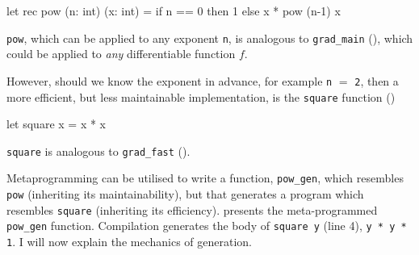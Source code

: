 \begin{code}
\begin{ocamllst}
let rec pow (n: int) (x: int) = 
  if n == 0 then 1 
  else x * pow (n-1) x
\end{ocamllst}
\label{listing:ocaml-pow-maintainable}
\end{code}

\texttt{pow}, which can be applied to any exponent \texttt{n}, is analogous to \texttt{grad_main} (), which could be applied to \textit{any} differentiable function $f$. 

However, should we know the exponent in advance, for example \texttt{n} $ =$ \texttt{2}, then a more efficient, but less maintainable implementation, is the \texttt{square} function () 

\begin{code}
\begin{ocamllst}
let square x = x * x
\end{ocamllst}
\label{listing:ocaml-pow-fast}
\end{code}

\noindent \texttt{square} is analogous to \texttt{grad_fast} ().

Metaprogramming can be utilised to write a function, \texttt{pow_gen}, which resembles \texttt{pow} (inheriting its maintainability), but that generates a program which resembles \texttt{square} (inheriting its efficiency).  presents the meta-programmed \texttt{pow_gen} function. Compilation generates the body of \texttt{square y} (line 4), \texttt{y * y * 1}. I will now explain the mechanics of generation.

\begin{code}
\label{listing:ocaml-pow-gen}
\end{code}

